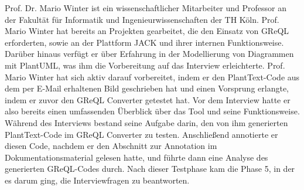 Prof. Dr. Mario Winter ist ein wissenschaftlicher Mitarbeiter und Professor an der Fakultät für Informatik und
Ingenieurwissenschaften der TH Köln. Prof. Mario Winter hat bereits an Projekten gearbeitet, die den Einsatz von GReQL
erforderten, sowie an der Plattform JACK und ihrer internen Funktionsweise. Darüber hinaus verfügt er über Erfahrung
in der Modellierung von Diagrammen mit PlantUML, was ihm die Vorbereitung auf das Interview erleichterte. Prof. Mario
Winter hat sich aktiv darauf vorbereitet, indem er den PlantText-Code aus dem per E-Mail erhaltenen Bild geschrieben
hat und einen Vorsprung erlangte, indem er zuvor den GReQL Converter getestet hat. Vor dem Interview hatte er also
bereits einen umfassenden Überblick über das Tool und seine Funktionsweise. Während des Interviews bestand seine
Aufgabe darin, den von ihm generierten PlantText-Code im GReQL Converter zu testen. Anschließend annotierte er diesen
Code, nachdem er den Abschnitt zur Annotation im Dokumentationsmaterial gelesen hatte, und führte dann eine Analyse
des generierten GReQL-Codes durch. Nach dieser Testphase kam die Phase 5, in der es darum ging, die Interviewfragen
zu beantworten.

